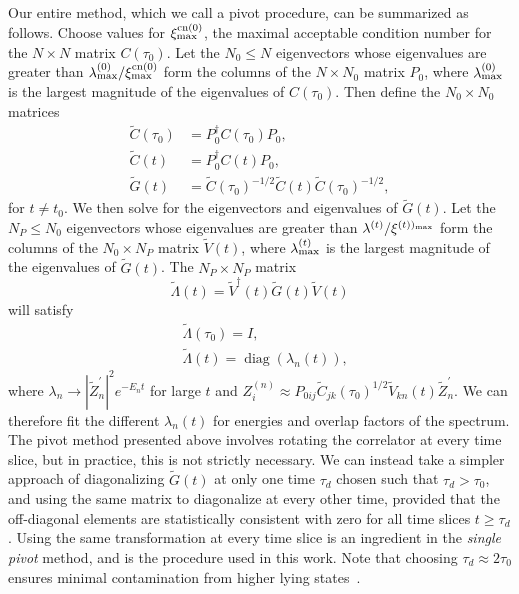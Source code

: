 Our entire method, which we call a pivot procedure, can be summarized as follows. Choose values for $\xi^{\rm{cn}(0)}_{\rm{max}}$, the maximal acceptable condition number for the $N\times N$ matrix $C(\tau_0)$. Let the $N_0 \leq N$ eigenvectors whose eigenvalues are greater than $\lambda^{(0)}_{\rm{max}}/\xi^{\rm{cn}(0)}_{\rm{max}}$ form the columns of the $N\times N_0$ matrix $P_0$, where $\lambda^{(0)}_{\rm{max}}$ is the largest magnitude of the eigenvalues of $C(\tau_0)$. Then define the $N_0\times N_0$ matrices
\begin{equation}
    \begin{aligned}
    \widetilde{C}\left(\tau_{0}\right)&=P_{0}^{\dagger} C\left(\tau_{0}\right) P_{0},\\
    \widetilde{C}(t)&=P_{0}^{\dagger} C(t) P_{0},\\
    \widetilde{G}(t)&=\widetilde{C}\left(\tau_{0}\right)^{-1 / 2} \widetilde{C}(t) \widetilde{C}\left(\tau_{0}\right)^{-1 / 2},
    \end{aligned}
\end{equation}
for $t\neq t_0$. We then solve for the eigenvectors and eigenvalues of $\widetilde G(t)$. Let the $N_P\leq N_0$ eigenvectors whose eigenvalues are greater than $\lambda^{(t)}/\xi^{(t))_{\rm{max}}}$ form the columns of the $N_0\times N_P$ matrix $\widetilde V(t)$, where $\lambda^{(t)}_{\rm{max}}$ is the largest magnitude of the eigenvalues of $\widetilde G(t)$. The $N_P\times N_P$ matrix
\begin{equation}
    \widetilde{\Lambda}(t)=\widetilde{V}^{\dagger}(t) \widetilde{G}(t) \tilde{V}(t)
\end{equation}
will satisfy
\begin{equation}
    \begin{aligned}
    &\widetilde{\Lambda}\left(\tau_{0}\right)=I,\\
    &\widetilde{\Lambda}(t)=\operatorname{diag}\left(\lambda_{n}(t)\right),
    \end{aligned}
\end{equation}
where $\lambda_n \rightarrow \left|\widetilde{Z}_{n}^{\prime}\right|^{2} e^{-E_{n} t}$ for large $t$ and $Z_{i}^{(n)} \approx P_{0 i j} \widetilde{C}_{j k}\left(\tau_{0}\right)^{1 / 2} \widetilde{V}_{k n}(t) \widetilde{Z}_{n}^{\prime}$. We can therefore fit the different $\lambda_n(t)$ for energies and overlap factors of the spectrum. The pivot method presented above involves rotating the correlator at every time slice, but in practice, this is not strictly necessary. We can instead take a simpler approach of diagonalizing $\widetilde G(t)$ at only one time $\tau_d$ chosen such that $\tau_d > \tau_0$, and using the same matrix to diagonalize at every other time, provided that the off-diagonal elements are statistically consistent with zero for all time slices $t \geq \tau_d$. Using the same transformation at every time slice is an ingredient in the \emph{single pivot} method, and is the procedure used in this work. Note that choosing $\tau_d \approx 2\tau_0$ ensures minimal contamination from higher lying states~\cite{Luscher:1990ck}.
